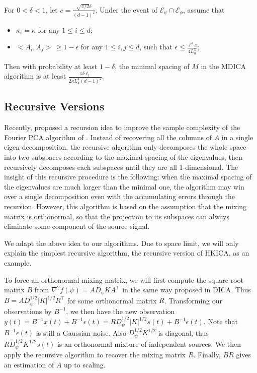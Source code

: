 \documentclass[twoside,11pt]{article}
\newcommand{\Epsi}{\mathcal{E}_{\psi}}
\newcommand{\Ephi}{\mathcal{E}_{\phi}}
\newcommand{\eps}{\epsilon}
\begin{document}
\begin{proposition}
\label{prop:spacingMDICA}
For $0<\delta <1$, let $c = \frac{\sqrt{\pi/2}\delta}{(d-1)^2}$. Under the event of $\Epsi\cap\Ephi$, assume that
\begin{itemize}
\item $\kappa_i = \kappa$ for any $1\le i\le d$;
\item $<A_i, A_j> \,\ge 1-\eps$ for any $1\le i, j \le d$, such that $\eps \le \frac{\ell^4 c}{4L_u^3}$;
\end{itemize}
Then with probability at least $1-\delta$, the minimal spacing of $M$  in the MDICA algorithm is at least $\frac{\pi\delta\ell_l}{2\kappa L_u^4 (d-1)^2}$. 
\end{proposition}

\subsection{Recursive Versions}
Recently, \citet{vempala2014max} proposed a recursion idea to improve the sample complexity of the Fourier PCA algorithm of \citet{goyal2014fourier}. 
Instead of recovering all the columns of $A$ in a single eigen-decomposition, the recursive algorithm only decomposes the whole space into two subspaces according to the maximal spacing of the eigenvalues, 
then recursively decomposes each subspaces until they are all 1-dimensional.
The insight of this recursive procedure is the following: when the maximal spacing of the eigenvalues are much larger than the minimal one, the algorithm may win over a single decomposition even with the accumulating errors through the recursion.
However, this algorithm is based on the assumption that the mixing matrix is orthonormal, so that the projection to its subspaces can always eliminate some component of the source signal. 

We adapt the above idea to our algorithms. Due to space limit, we will only explain the simplest recursive algorithm, the recursive version of HKICA, as an example.

To force an orthonormal mixing matrix, we will first compute the square root matrix $B$ from $\nabla^2f(\psi) = AD_{\psi}KA^{\top}$ in the same way proposed in DICA. 
Thus $B = AD_{\psi}^{1/2}|K|^{1/2}R^{\top}$ for some orthonormal matrix $R$. 
Transforming our observations by $B^{-1}$, we then have the new observation $y(t) = B^{-1}x(t) + B^{-1}\eps(t) = RD_{\psi}^{1/2}|K|^{1/2}s(t) + B^{-1}\eps(t)$. 
Note that $B^{-1}\eps(t)$ is still a Gaussian noise. Also $D_{\psi}^{1/2}K^{1/2}$ is diagonal, thus $RD_{\psi}^{1/2}K^{1/2}s(t)$ is an orthonormal mixture of independent sources.
We then apply the recursive algorithm to recover the mixing matrix $R$. Finally, $BR$ gives an estimation of $A$ up to scaling.
\end{document}
